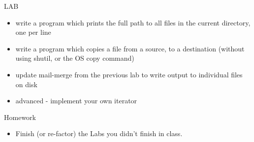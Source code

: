 \documentclass{beamer}
\begin{document}
\begin{frame}{LAB}

\begin{itemize}
  \item write a program which prints the full path to all files in the current directory, one per line
  \item write a program which copies a file from a source, to a
        destination (without using shutil, or the OS copy command)
   \item update mail-merge from the previous lab to write output
         to individual files on disk
   \item advanced - implement your own iterator
\end{itemize}

\end{frame}



\begin{frame}{Homework}

\begin{itemize}
  \item Finish (or re-factor) the Labs you didn't finish in class.
\end{itemize}

\end{frame}
\end{document}
